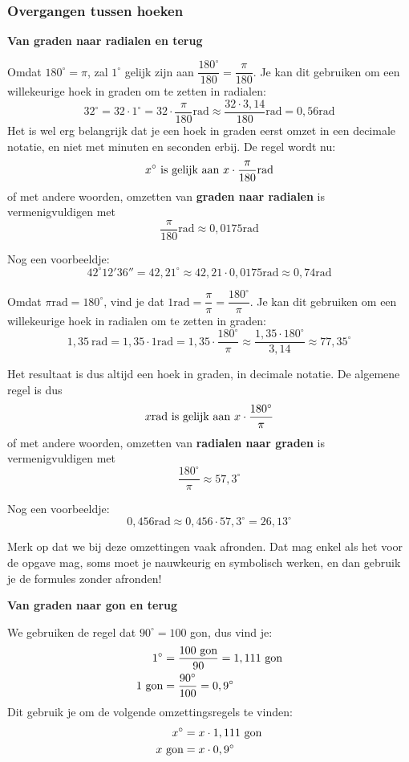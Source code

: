 \subsubsection{Overgangen tussen hoeken}

\textbf{Van graden naar radialen en terug}

Omdat $180^\circ = \pi$, zal $1^\circ$ gelijk zijn aan $\dfrac{180^\circ}{180}=\dfrac{\pi}{180}$. Je kan dit gebruiken om een willekeurige hoek in graden om te zetten in radialen:
\[32^\circ = 32\cdot 1^\circ = 32 \cdot \frac{\pi}{180} \text{rad}\approx \frac{32\cdot 3,14}{180}\text{rad}=0,56\text{rad}\]
Het is wel erg belangrijk dat je een hoek in graden eerst omzet in een decimale notatie, en niet met minuten en seconden erbij. De regel wordt nu:
\begin{equation*}
x^\circ \textup{ is gelijk aan } x\cdot \frac{\pi}{180} \text{rad}
\end{equation*}
of met andere woorden, omzetten van \textbf{graden naar radialen} is vermenigvuldigen met
\begin{equation*}
\dfrac{\pi}{180}\text{rad}\approx 0,0175\text{rad}
\end{equation*}

Nog een voorbeeldje:
\[42^\circ12'36''=42,21^\circ\approx 42,21 \cdot 0,0175 \text{rad}\approx 0,74 \text{rad}\]

Omdat $\pi \text{rad} = 180^\circ$, vind je dat $1 \text{rad} = \dfrac{\pi}{\pi}=\dfrac{180^\circ}{\pi}$. Je kan dit gebruiken om een willekeurige hoek in radialen om te zetten in graden:
\[1,35~\text{rad} = 1,35 \cdot 1 \text{rad} = 1,35 \cdot \frac{180^\circ}{\pi}\approx \frac{1,35 \cdot 180^\circ}{3,14}\approx 77,35^\circ\]

Het resultaat is dus altijd een hoek in graden, in decimale notatie.  De algemene regel is dus
\[x \text{rad} \textup{ is gelijk aan } x\cdot \frac{180^\circ}{\pi}\]
of met andere woorden, omzetten van \textbf{radialen naar graden} is vermenigvuldigen met
\[
\frac{180^\circ}{\pi} \approx 57,3^\circ
\]

Nog een voorbeeldje:
\[0,456 \text{rad} \approx 0,456 \cdot 57,3^\circ = 26,13^\circ\]

Merk op dat we bij deze omzettingen vaak afronden. Dat mag enkel als het voor de opgave mag, soms moet je nauwkeurig en symbolisch werken, en dan gebruik je de formules zonder afronden!

\textbf{Van graden naar gon en terug}

We gebruiken de regel dat $90^\circ=100$ gon, dus vind je:
\begin{align*}
1^\circ &= \frac{100 \textup{ gon}}{90}= 1,111 \textup{ gon}\\
1 \textup{ gon} &= \frac{90^\circ}{100} = 0,9^\circ
\end{align*}
Dit gebruik je om de volgende omzettingsregels te vinden:
\begin{align*}
x^\circ &= x\cdot 1,111 \textup{ gon}\\
x \textup{ gon} &= x\cdot 0,9^\circ
\end{align*}

